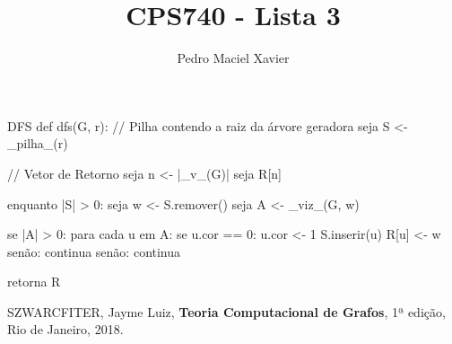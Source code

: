 \documentclass{homework}
\title{CPS740 - Lista 3}
\author{Pedro Maciel Xavier}
\begin{document}
	
	\maketitle
	
	\quest %
	
	\subsubquest 
	\begin{fig}
	
	\end{fig}

	\subsubquest 
	\begin{fig}
		
	\end{fig}

	\quest %
	
	\subsubquest
	
	\begin{algor}{DFS}
	def dfs(G, r):
		// Pilha contendo a raiz da árvore geradora
		seja S <- _pilha_({r})
		
		// Vetor de Retorno
		seja n <- |_v_(G)|
		seja R[n]
		
		enquanto |S| > 0:
			seja w <- S.remover()
			seja A <- _viz_(G, w)
			
			se |A| > 0:
				para cada u em A:
					se u.cor == 0:
						u.cor <- 1
						S.inserir(u)
						R[u] <- w
					senão:
						continua
			senão:
				continua

		retorna R
	\end{algor}

	\subsubquest
	
	\quest %
	
	\quest %
	
	\begin{fig}
		
	\end{fig}
	
	\quest %
	
	
	
	\begin{thebibliography}{10}
		 SZWARCFITER, Jayme Luiz, \textbf{Teoria Computacional de Grafos}, 1ª edição, Rio de Janeiro, 2018.
	\end{thebibliography}
\end{document}
